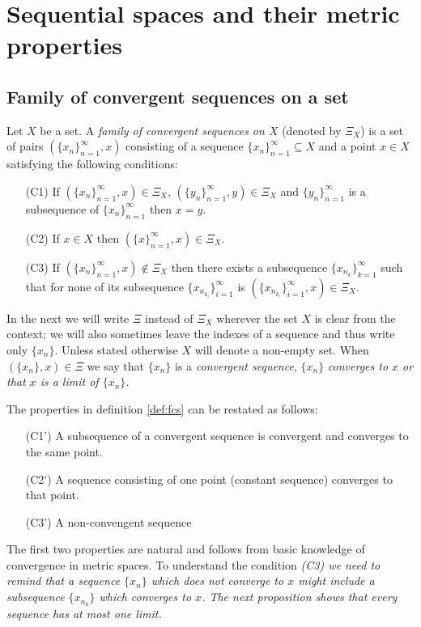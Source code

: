 \chapter{Sequential spaces and their metric properties} 

\section{Family of convergent sequences on a set}

\begin{define}\label{def:fcs}
Let $X$ be a set. A {\sl family of convergent sequences on $X$} (denoted by $\Xi_X$) is a set of pairs $(\{x_n\}^\infty_{n=1},x)$ consisting of a sequence $\{x_n\}^\infty_{n=1}\subseteq X$ and a point $x\in X$ satisfying the following conditions:
\begin{enumerate}
	\item[(C1)] If $(\{x_n\}^\infty_{n=1},x)\in\Xi_X$, $(\{y_n\}^\infty_{n=1},y)\in\Xi_X$ and $\{y_n\}^\infty_{n=1}$ is a subsequence of $\{x_n\}^\infty_{n=1}$ then $x=y$.
	\item[(C2)] If $x\in X$ then $(\{x\}^\infty_{n=1},x)\in\Xi_X$.
	\item[(C3)] If  $(\{x_n\}^\infty_{n=1},x)\notin\Xi_X$ then there exists a subsequence $\{x_{n_k}\}^\infty_{k=1}$ such that for none of its subsequence $\{x_{n_{k_i}}\}^\infty_{i=1}$ is $(\{x_{n_{k_i}}\}^\infty_{i=1},x)\in\Xi_X$.
\end{enumerate}
\end{define}

In the next we will write $\Xi$ instead of $\Xi_X$ wherever the set $X$ is clear from the context; we will also sometimes leave the indexes of a sequence and thus write only $\{x_n\}$. Unless stated otherwise $X$ will denote a non-empty set. When $(\{x_n\},x)\in\Xi$ we say that $\{x_n\}$ is a {\sl convergent sequence}, $\{x_n\}$ \sl{converges} to $x$ or that $x$ is a limit of  $\{x_n\}$.

The properties in definition \ref{def:fcs} can be restated as follows:
\begin{enumerate}
	\item[(C1')] A subsequence of a convergent sequence is convergent and converges to the same point.
	\item[(C2')] A sequence consisting of one point (constant sequence) converges to that point.
	\item[(C3')] A non-convengent sequence \tbd
\end{enumerate}
The first two properties are natural and follows from basic knowledge of convergence in metric spaces. To understand the condition \sl{(C3)} we need to remind that a sequence $\{x_n\}$ which does not converge to $x$ might include a subsequence $\{x_{n_k}\}$ which converges to $x$. The next proposition shows that every sequence has at most one limit.

